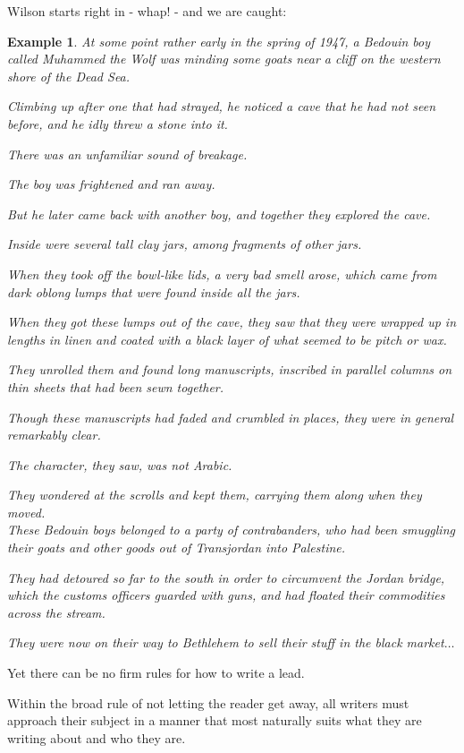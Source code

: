 \documentclass{book}
\numberwithin{equation}{section}
\newtheorem{example}{Example}[chapter]
\begin{document}
Wilson starts right in - whap! - and we are caught:
\begin{example}
    At some point rather early in the spring of 1947, a Bedouin boy called Muhammed the Wolf was minding some goats near a cliff on the western shore of the Dead Sea.
    
    Climbing up after one that had strayed, he noticed a cave that he had not seen before, and he idly threw a stone into it.
    
    There was an unfamiliar sound of breakage.
    
    The boy was frightened and ran away.
    
    But he later came back with another boy, and together they explored the cave.
    
    Inside were several tall clay jars, among fragments of other jars.
    
    When they took off the bowl-like lids, a very bad smell arose, which came from dark oblong lumps that were found inside all the jars.
    
    When they got these lumps out of the cave, they saw that they were wrapped up in lengths in linen and coated with a black layer of what seemed to be pitch or wax.
    
    They unrolled them and found long manuscripts, inscribed in parallel columns on thin sheets that had been sewn together.
    
    Though these manuscripts had faded and crumbled in places, they were in general remarkably clear.
    
    The character, they saw, was not Arabic.
    
    They wondered at the scrolls and kept them, carrying them along when they moved.
    \\
    
    These Bedouin boys belonged to a party of contrabanders, who had been smuggling their goats and other goods out of Transjordan into Palestine.
    
    They had detoured so far to the south in order to circumvent the Jordan bridge, which the customs officers guarded with guns, and had floated their commodities across the stream.
    
    They were now on their way to Bethlehem to sell their stuff in the black market$\ldots$
\end{example}
Yet there can be no firm rules for how to write a lead.

Within the broad rule of not letting the reader get away, all writers must approach their subject in a manner that most naturally suits what they are writing about and who they are.
\end{document}
